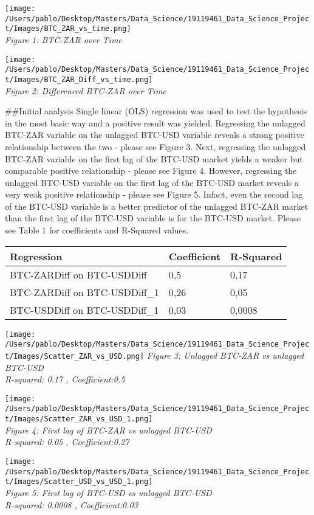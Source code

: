 \documentclass[
]{article}
\begin{document}
\texttt{[image: /Users/pablo/Desktop/Masters/Data\_Science/19119461\_Data\_Science\_Project/Images/BTC\_ZAR\_vs\_time.png]}\\
\emph{Figure 1: BTC-ZAR over Time}

\texttt{[image: /Users/pablo/Desktop/Masters/Data\_Science/19119461\_Data\_Science\_Project/Images/BTC\_ZAR\_Diff\_vs\_time.png]}\\
\emph{Figure 2: Differenced BTC-ZAR over Time}

\#\#Initial analysis Single linear (OLS) regression was used to test the
hypothesis in the most basic way and a positive result was yielded.
Regressing the unlagged BTC-ZAR variable on the unlagged BTC-USD
variable reveals a strong positive relationship between the two - please
see Figure 3. Next, regressing the unlagged BTC-ZAR variable on the
first lag of the BTC-USD market yields a weaker but comparable positive
relationship - please see Figure 4. However, regressing the unlagged
BTC-USD variable on the first lag of the BTC-USD market reveals a very
weak positive relationship - please see Figure 5. Infact, even the
second lag of the BTC-USD variable is a better predictor of the unlagged
BTC-ZAR market than the first lag of the BTC-USD variable is for the
BTC-USD market. Please see Table 1 for coefficients and R-Squared
values.

\begin{longtable}[]{@{}lll@{}}
\toprule
Regression & Coefficient & R-Squared \\
\midrule
\endhead
BTC-ZARDiff on BTC-USDDiff & 0,5 & 0,17 \\
BTC-ZARDiff on BTC-USDDiff\_1 & 0,26 & 0,05 \\
BTC-USDDiff on BTC-USDDiff\_1 & 0,03 & 0,0008 \\
\bottomrule
\end{longtable}

\texttt{[image: /Users/pablo/Desktop/Masters/Data\_Science/19119461\_Data\_Science\_Project/Images/Scatter\_ZAR\_vs\_USD.png]}
\emph{Figure 3: Unlagged BTC-ZAR vs unlagged BTC-USD}\\
\emph{R-squared: 0.17 , Coefficient:0.5}

\texttt{[image: /Users/pablo/Desktop/Masters/Data\_Science/19119461\_Data\_Science\_Project/Images/Scatter\_ZAR\_vs\_USD\_1.png]}\\
\emph{Figure 4: First lag of BTC-ZAR vs unlagged BTC-USD}\\
\emph{R-squared: 0.05 , Coefficient:0.27}

\texttt{[image: /Users/pablo/Desktop/Masters/Data\_Science/19119461\_Data\_Science\_Project/Images/Scatter\_USD\_vs\_USD\_1.png]}\\
\emph{Figure 5: First lag of BTC-USD vs unlagged BTC-USD}\\
\emph{R-squared: 0.0008 , Coefficient:0.03}
\end{document}
